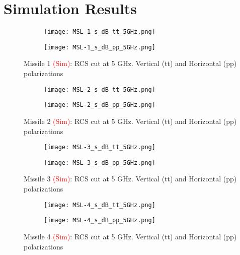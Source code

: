 \chapter{Simulation Results}
\label{app:simulation_results}
  \begin{figure}[htbp]
    \centering
    \begin{subfigure}{.5\textwidth}
      \centering
      \texttt{[image: MSL-1\_s\_dB\_tt\_5GHz.png]}
    \end{subfigure}%
    \begin{subfigure}{.5\textwidth}
      \centering
      \texttt{[image: MSL-1\_s\_dB\_pp\_5GHz.png]}
    \end{subfigure}
    \caption{Missile 1 \textcolor{red}{(Sim)}:  RCS cut at 5 GHz. Vertical (tt) and Horizontal (pp) polarizations }
    \label{fig:ns1}
  \end{figure}

  \begin{figure}[htbp]
    \centering
    \begin{subfigure}{.5\textwidth}
      \centering
      \texttt{[image: MSL-2\_s\_dB\_tt\_5GHz.png]}
    \end{subfigure}%
    \begin{subfigure}{.5\textwidth}
      \centering
      \texttt{[image: MSL-2\_s\_dB\_pp\_5GHz.png]}
    \end{subfigure}
    \caption{Missile 2 \textcolor{red}{(Sim)}:  RCS cut at 5 GHz. Vertical (tt) and Horizontal (pp) polarizations }
    \label{fig:ns2}
  \end{figure}

  \begin{figure}[htbp]
    \centering
    \begin{subfigure}{.5\textwidth}
      \centering
      \texttt{[image: MSL-3\_s\_dB\_tt\_5GHz.png]}
    \end{subfigure}%
    \begin{subfigure}{.5\textwidth}
      \centering
      \texttt{[image: MSL-3\_s\_dB\_pp\_5GHz.png]}
    \end{subfigure}
    \caption{Missile 3 \textcolor{red}{(Sim)}:  RCS cut at 5 GHz. Vertical (tt) and Horizontal (pp) polarizations }
    \label{fig:ns3}
  \end{figure}

  \begin{figure}[htbp]
    \centering
    \begin{subfigure}{.5\textwidth}
      \centering
      \texttt{[image: MSL-4\_s\_dB\_tt\_5GHz.png]}
    \end{subfigure}%
    \begin{subfigure}{.5\textwidth}
      \centering
      \texttt{[image: MSL-4\_s\_dB\_pp\_5GHz.png]}
    \end{subfigure}
    \caption{Missile 4 \textcolor{red}{(Sim)}:  RCS cut at 5 GHz. Vertical (tt) and Horizontal (pp) polarizations }
    \label{fig:ns4}
  \end{figure}

